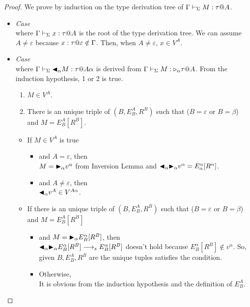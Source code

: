 \begin{proof}
	We prove by induction on the type derivation tree of $\G \V M:\tau@A$.
			
	\begin{itemize}
		\item \textit{Case} \TVar\\
		      where \(\G\V x:\tau@A\) is the root of the type derivation tree.
		      We can assume $A \neq \varepsilon$ because $x:\tau@\varepsilon \notin \G$.
		      Then, when $ A \neq \varepsilon$, $x \in V^A$.
		\item \textit{Case} \TTBL{}\\
		      where \(\Gamma \vdash_\Sigma {\mathop{\blacktriangleleft}}_\alpha M :\tau @ A\alpha\) is derived from \(\Gamma \vdash_\Sigma M : {\mathop{\triangleright}}_\alpha \tau @ A\).
		      From the induction hypothesis, 1 or 2 is true.
		      \begin{enumerate}
		      	\item $ M \in V^A$.
		      	\item There is an unique triple of $(B, E^A_B, R^B)$ such that ($B = \varepsilon$ or $B = \beta$) and $M = E^A_B[R^B]$.
		      \end{enumerate}
		      \begin{itemize}
		      	\item If $ M \in V^A$ is true
					\begin{itemize}
						\item and $A=\varepsilon$, then\\
							$ M = {\mathop{\blacktriangleright}}_\alpha v^\alpha $ from Inversion Lemma and
		      	      		${\mathop{\blacktriangleleft}}_\alpha {\mathop{\blacktriangleright}}_\alpha v^\alpha = E^\alpha_\alpha [R^\alpha]$.
						\item and $A\neq\varepsilon$, then\\
							${\mathop{\blacktriangleleft}}_\alpha v^A \in V^{A\alpha}$.
					\end{itemize}
		      	\item If there is an unique triple of $(B, E^A_B, R^B)$ such that ($B = \varepsilon$ or $B = \beta$) and $M = E^A_B[R^B]$
		      	    	\begin{itemize}
		      	    	\item and $ M = {\mathop{\blacktriangleright}}_\alpha E^\alpha_B[R^B] $, then\\
		      	    	    $ {\mathop{\blacktriangleleft}}_\alpha {\mathop{\blacktriangleright}}_\alpha E^\alpha_B[R^B] \longrightarrow_s E^\alpha_B[R^B]$ doesn't hold because $ E^\alpha_B[R^B] \notin v^\alpha$.
		      	    	    So, given $B, E^A_B, R^B$ are the unique tuples satisfies the condition.
		      	    	\item Otherwise,\\
		      	          	It is obvious from the induction hypothesis and the definition of $E^A_B$.
		      	    \end{itemize}
		      \end{itemize}
		      		      	      	      	      	      	      	      	      	      	      	      	      		      	      	      	      

\end{itemize}
\end{proof}
